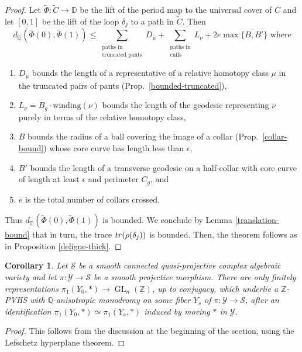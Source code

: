 \documentclass[10pt,letterpaper,english,reqno]{amsart}
\numberwithin{equation}{subsection}
\newcommand\cS{{\mathcal S}}
\newcommand\cY{{\mathcal Y}}
\newcommand\bD{{\mathbb D}}
\newcommand\Q{{\mathbb Q}}
\newcommand\Z{{\mathbb Z}}
\DeclareMathOperator{\GL}{GL}
\newtheorem{corollary}[theorem]{Corollary}
\theoremstyle{definition}
\begin{document}
\begin{proof}
Let $\widetilde{\Phi}\colon \widetilde{C}\to \bD$ be the
lift of the period map to the universal cover of $C$
and let $[0,1]$ be the lift of the loop $\delta_j$
to a path in $\widetilde{C}$. Then
$$d_\bD(\widetilde{\Phi}(0),\widetilde{\Phi}(1))\leq \!\!\!\!\! \sum_{\substack{ \textrm{paths in} \\ \textrm{truncated pants}}} \!\!\!\!\! D_\mu +\sum_{\substack{ \textrm{paths in} \\ \textrm{cuffs}}} L_\nu + 2e\max\{B,B'\}\textrm{ where}$$
\begin{enumerate}
    \item $D_\mu$ bounds the length of a representative of a relative homotopy class $\mu$ in the truncated pairs of pants (Prop.~\ref{bounded-truncated}),
    \item $L_\nu=B_g\cdot \textrm{winding}(\nu)$ bounds the length of the geodesic representing $\nu$ purely in terms of the relative homotopy class,
    \item $B$ bounds the radius of a ball covering the image of a collar
(Prop.~\ref{collar-bound}) whose core curve has length less than $\epsilon$,
\item $B'$ bounds the length of a transverse geodesic on a half-collar with core curve of length at least $\epsilon$ and perimeter $C_g$, and 
\item $e$ is the total number of 
collars crossed.
\end{enumerate}

Thus 
$d_{\bD}(\widetilde{\Phi}(0),\widetilde{\Phi}(1))$
is bounded.
We conclude by Lemma \ref{translation-bound} that in turn,
the trace ${\rm tr}(\rho(\delta_j))$ is bounded.
Then, the theorem follows as in
Proposition \ref{deligne-thick}.
\end{proof}

\begin{corollary}\label{monodromy-finite}
Let $\cS$ be a smooth connected quasi-projective complex algebraic variety and let $\pi:\cY\to \cS$ be a smooth projective morphism. There are only finitely representations $\pi_1(Y_0,*)\rightarrow 
\GL_n(\Z)$, up to conjugacy, which underlie a $\Z$-PVHS with $\Q$-anisotropic monodromy on some fiber $Y_s$ of $\pi:\cY\rightarrow\cS$, after an identification $\pi_1(Y_0,*)\simeq\pi_1(Y_s,*)$ induced by
moving $*$ in $\cY$.
\end{corollary}

\begin{proof} This follows from the discussion at the beginning of the section, using the Lefschetz hyperplane theorem. 
\end{proof}
\end{document}
